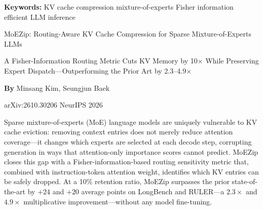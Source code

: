 \documentclass[10pt,twocolumn]{article}
\begin{document}
\setlength{\parindent}{0pt}
\setlength{\parskip}{4pt}

{\small\color{keywordgray}\textbf{Keywords:}
  KV cache compression \textbullet{}
  mixture-of-experts \textbullet{}
  Fisher information \textbullet{}
  efficient LLM inference}\par\vspace{4pt}

{\LARGE\bfseries\raggedright
  MoEZip: Routing-Aware KV Cache Compression for Sparse
  Mixture-of-Experts LLMs}\par\vspace{4pt}

{\large\itshape\raggedright
  A Fisher-Information Routing Metric Cuts KV Memory by 10$\times$ While
  Preserving Expert Dispatch---Outperforming the Prior Art by 2.3--4.9$\times$}\par\vspace{6pt}

{\small\textbf{By} Minsang Kim, Seungjun Baek}\par\vspace{2pt}

{\small\color{keywordgray}arXiv:2610.30206 \textbullet{}
  NeurIPS 2026}
\par\vspace{2pt}\noindent{\color{rulered}\rule{\columnwidth}{0.6pt}}\vspace{6pt}

Sparse mixture-of-experts (MoE) language models are uniquely
vulnerable to KV cache eviction: removing context entries does not merely
reduce attention coverage---it changes which experts are selected at each
decode step, corrupting generation in ways that attention-only importance
scores cannot predict. MoEZip closes this gap with a
Fisher-information-based routing sensitivity metric that, combined
with instruction-token attention weight, identifies which KV entries
can be safely dropped. At a 10\% retention ratio, MoEZip
surpasses the prior state-of-the-art by $+24$ and $+20$ average
points on LongBench and RULER---a $2.3\times$ and $4.9\times$
multiplicative improvement---without any model fine-tuning.
\end{document}
